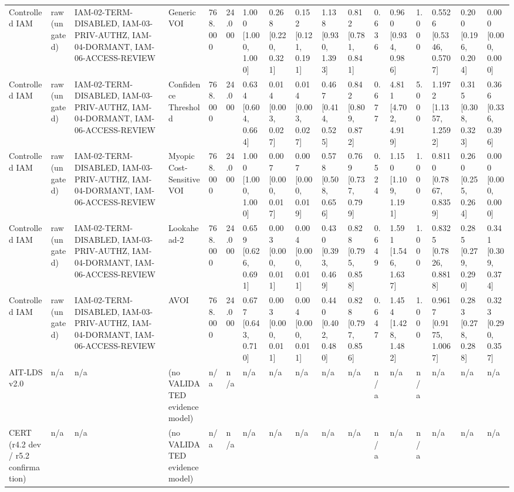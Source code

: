 \begin{table}[!ht]
{\begin{tabular}{lllllllllllllllll}
Controlled IAM & raw (ungated) & IAM-02-TERM-DISABLED, IAM-03-PRIV-AUTHZ, IAM-04-DORMANT, IAM-06-ACCESS-REVIEW & Generic VOI & 768.000 & 24.000 & 1.000 [1.000, 1.000] & 0.268 [0.220, 0.321] & 0.152 [0.121, 0.191] & 1.138 [0.930, 1.393] & 0.812 [0.781, 0.841] & 0.636 & 0.960 [0.934, 0.986] & 1.000 & 0.5526 [0.5346, 0.5707] & 0.200 [0.196, 0.204] & 0.000 [0.000, 0.000] \\
Controlled IAM & raw (ungated) & IAM-02-TERM-DISABLED, IAM-03-PRIV-AUTHZ, IAM-04-DORMANT, IAM-06-ACCESS-REVIEW & Confidence Threshold & 768.000 & 24.000 & 0.634 [0.604, 0.664] & 0.014 [0.003, 0.027] & 0.014 [0.003, 0.027] & 0.467 [0.414, 0.525] & 0.842 [0.809, 0.872] & 0.677 & 4.811 [4.702, 4.919] & 5.000 & 1.1972 [1.1357, 1.2592] & 0.315 [0.308, 0.323] & 0.366 [0.336, 0.396] \\
Controlled IAM & raw (ungated) & IAM-02-TERM-DISABLED, IAM-03-PRIV-AUTHZ, IAM-04-DORMANT, IAM-06-ACCESS-REVIEW & Myopic Cost-Sensitive VOI & 768.000 & 24.000 & 1.000 [1.000, 1.000] & 0.007 [0.000, 0.017] & 0.007 [0.000, 0.019] & 0.578 [0.508, 0.656] & 0.769 [0.737, 0.799] & 0.524 & 1.150 [1.109, 1.191] & 1.000 & 0.8110 [0.7867, 0.8359] & 0.260 [0.255, 0.264] & 0.000 [0.000, 0.000] \\
Controlled IAM & raw (ungated) & IAM-02-TERM-DISABLED, IAM-03-PRIV-AUTHZ, IAM-04-DORMANT, IAM-06-ACCESS-REVIEW & Lookahead-2 & 768.000 & 24.000 & 0.659 [0.626, 0.691] & 0.003 [0.000, 0.011] & 0.004 [0.000, 0.011] & 0.430 [0.393, 0.469] & 0.828 [0.795, 0.858] & 0.649 & 1.591 [1.546, 1.637] & 1.000 & 0.8325 [0.7826, 0.8818] & 0.285 [0.279, 0.290] & 0.341 [0.309, 0.374] \\
Controlled IAM & raw (ungated) & IAM-02-TERM-DISABLED, IAM-03-PRIV-AUTHZ, IAM-04-DORMANT, IAM-06-ACCESS-REVIEW & AVOI & 768.000 & 24.000 & 0.677 [0.643, 0.710] & 0.003 [0.000, 0.011] & 0.004 [0.000, 0.011] & 0.440 [0.402, 0.480] & 0.828 [0.797, 0.856] & 0.647 & 1.454 [1.428, 1.482] & 1.000 & 0.9617 [0.9175, 1.0067] & 0.283 [0.278, 0.288] & 0.323 [0.290, 0.357] \\
AIT-LDS v2.0 & n/a & n/a & (no VALIDATED evidence model) & n/a & n/a & n/a & n/a & n/a & n/a & n/a & n/a & n/a & n/a & n/a & n/a & n/a \\
CERT (r4.2 dev / r5.2 confirmation) & n/a & n/a & (no VALIDATED evidence model) & n/a & n/a & n/a & n/a & n/a & n/a & n/a & n/a & n/a & n/a & n/a & n/a & n/a \\
\bottomrule
\end{tabular}}
\end{table}
